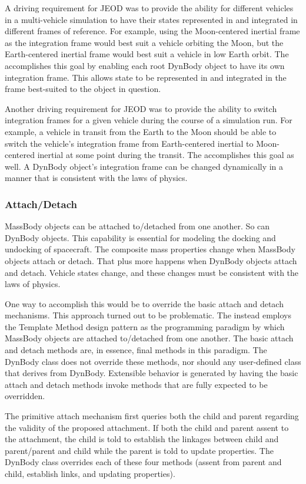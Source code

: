 A driving requirement for JEOD was to provide the ability for different
vehicles in a multi-vehicle simulation to have their states represented in
and integrated in different frames of reference.
For example, using the Moon-centered inertial frame as the
integration frame would best suit a vehicle orbiting the Moon, but the
Earth-centered inertial frame would best suit a vehicle in low Earth orbit.
The \ModelDesc accomplishes this goal by enabling each root DynBody object to
have its own integration frame. This allows state to be represented in and
integrated in the frame best-suited to the object in question.

Another driving requirement for JEOD was to provide the ability to switch
integration frames for a given vehicle during the course of a simulation run.
For example, a vehicle in transit from the Earth to the Moon should be able
to switch the vehicle's integration frame from Earth-centered inertial to
Moon-centered inertial at some point during the transit. The \ModelDesc
accomplishes this goal as well. A DynBody object's integration frame can
be changed dynamically in a manner that is consistent with the laws of physics.

\subsubsection{Attach/Detach}\label{sec:key_attach_detach}
MassBody objects can be attached to/detached from one another. So can
DynBody objects. This capability is essential for modeling the docking and
undocking of spacecraft. The composite mass properties change when MassBody
objects attach or detach. That plus more happens when DynBody objects attach
and detach. Vehicle states change, and these changes must be consistent
with the laws of physics.

One way to accomplish this would be to override the basic \MASS attach and
detach mechanisms. This approach turned out to be problematic. The \MASS
instead employs the Template Method design pattern as the programming paradigm
by which MassBody objects are attached to/detached from one another.
The basic \MASS attach and detach methods are, in essence, final
methods in this paradigm. The DynBody class does not override these methods,
nor should any user-defined class that derives from DynBody.
Extensible behavior is generated by having the basic attach and detach
methods invoke methods that are fully expected to be overridden.

The primitive \MASS attach mechanism first queries both the child and parent
regarding the validity of the proposed attachment. If both the child and parent
assent to the attachment, the child is told to establish the linkages between
child and parent/parent and child while the parent is told to update
properties.  The DynBody class overrides each of these four methods (assent
from parent and child, establish links, and updating properties).

